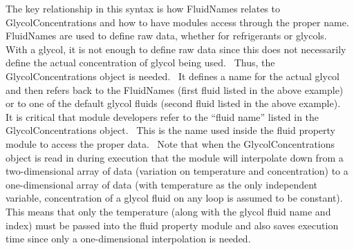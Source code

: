 The key relationship in this syntax is how FluidNames relates to GlycolConcentrations and how to have modules access through the proper name.~ FluidNames are used to define raw data, whether for refrigerants or glycols.~ With a glycol, it is not enough to define raw data since this does not necessarily define the actual concentration of glycol being used.~ Thus, the GlycolConcentrations object is needed.~ It defines a name for the actual glycol and then refers back to the FluidNames (first fluid listed in the above example) or to one of the default glycol fluids (second fluid listed in the above example).~ It is critical that module developers refer to the ``fluid name'' listed in the GlycolConcentrations object.~ This is the name used inside the fluid property module to access the proper data.~ Note that when the GlycolConcentrations object is read in during execution that the module will interpolate down from a two-dimensional array of data (variation on temperature and concentration) to a one-dimensional array of data (with temperature as the only independent variable, concentration of a glycol fluid on any loop is assumed to be constant).~ This means that only the temperature (along with the glycol fluid name and index) must be passed into the fluid property module and also saves execution time since only a one-dimensional interpolation is needed.

